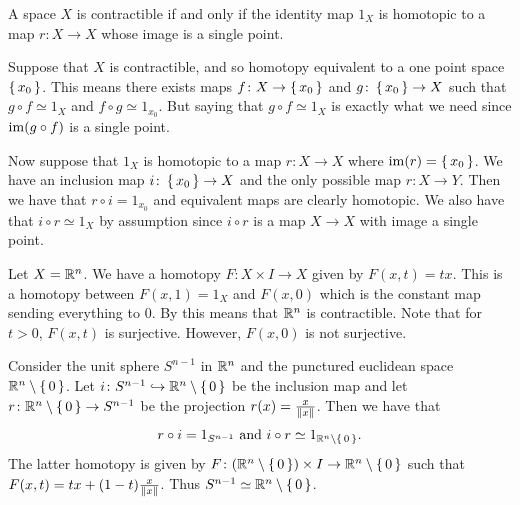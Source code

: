 \documentclass[letterpaper, 11pt, oneside]{book}
\begin{document}
\begin{prop}\label{prop: contractible_iff_single_point}
  A space $X$ is contractible if and only if the identity map $1_{X}$ is homotopic to a map $r\colon X \to X$ whose image is a single point.
\end{prop}
\begin{pf}
  Suppose that $X$ is contractible, and so homotopy equivalent to a one point space $\set{x_{0}}$.
  This means there exists maps $f\colon X \to \set{x_{0}}$ and $g\colon \set{x_{0}} \to X$ such that $g \circ f \simeq 1_{X}$ and $f \circ g \simeq 1_{x_{0}}$.
  But saying that $g \circ f \simeq 1_{X}$ is exactly what we need since $\operatorname{im}(g \circ f)$ is a single point.

  Now suppose that $1_{X}$ is homotopic to a map $r\colon X \to X$ where $\operatorname{im}(r) = \set{x_{0}}$.
  We have an inclusion map $i\colon \set{x_{0}} \to X$ and the only possible map $r\colon X \to Y$.
  Then we have that $r \circ i = 1_{x_{0}}$ and equivalent maps are clearly homotopic.
  We also have that $i \circ r \simeq 1_{X}$ by assumption since $i \circ r$ is a map $X \to X$ with image a single point.
\end{pf}

\begin{ex}
  Let $X = \mathbb{R}^{n}$.
  We have a homotopy $F\colon X \times I \to X$ given by $F(x, t) = tx$.
  This is a homotopy between $F(x, 1) = 1_{X}$ and $F(x, 0)$ which is the constant map sending everything to $0$.
  By  this means that $\mathbb{R}^{n}$ is contractible.
  Note that for $t > 0$, $F(x, t)$ is surjective.
  However, $F(x, 0)$ is not surjective.
\end{ex}

\begin{ex}
  Consider the unit sphere $S^{n - 1}$ in $\mathbb{R}^{n}$ and the punctured euclidean space $\mathbb{R}^{n} \setminus \set{0}$.
  Let $i\colon S^{n - 1} \into \R^{n} \setminus \set{0}$ be the inclusion map and let $r\colon \mathbb{R}^{n} \setminus \set{0} \to S^{n - 1}$ be the projection $r(x) = \frac{x}{\norm{x}}$.
  Then we have that
  \[
    r \circ i = 1_{S^{n - 1}} \text{ and } i \circ r \simeq 1_{\mathbb{R}^{n} \setminus \set{0}}.
  \]
  The latter homotopy is given by $F\colon \pqty{\R^{n} \setminus \set{0}} \times I \to \R^{n} \setminus \set{0}$ such that $F(x, t) = tx + (1 - t)\frac{x}{\norm{x}}$.
  Thus $S^{n - 1} \simeq \mathbb{R}^{n} \setminus \set{0}$.
\end{ex}
\end{document}
